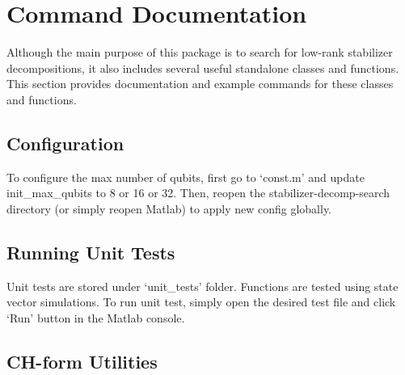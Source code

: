 \documentclass[11pt]{article}
\begin{document}

\section{Command Documentation}
Although the main purpose of this package is to search for low-rank stabilizer decompositions, it also includes several useful standalone classes and functions. This section provides documentation and example commands for these classes and functions.

\subsection{Configuration}
To configure the max number of qubits, first go to `const.m' and update init\_max\_qubits to 8 or 16 or 32. Then, reopen the stabilizer-decomp-search directory (or simply reopen Matlab) to apply new config globally.

\subsection{Running Unit Tests}
Unit tests are stored under `unit\_tests' folder. Functions are tested using state vector simulations. To run unit test, simply open the desired test file and click `Run' button in the Matlab console. 

\subsection{CH-form Utilities}
\end{document}
